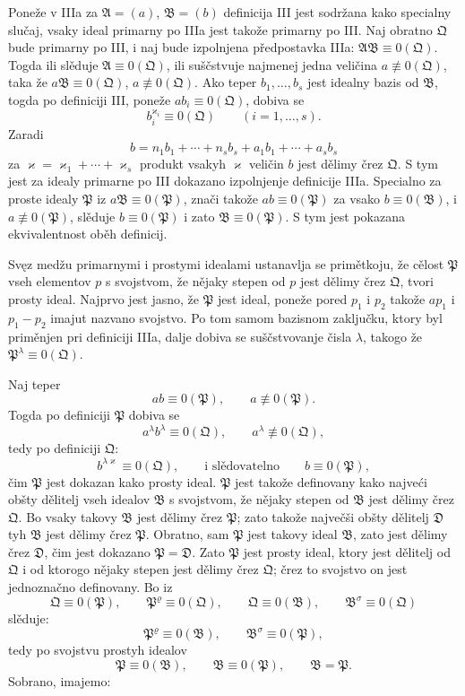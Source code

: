 \documentclass[11pt]{article}
\newcommand{\ideal}[1]{\mathfrak{#1}}
\begin{document}
Poneže v IIIa za \(\ideal A=(a)\), \(\ideal B=(b)\) definicija III jest sodržana kako specialny slučaj, vsaky ideal primarny po IIIa jest takože primarny po III. Naj obratno \(\ideal Q\) bude primarny po III, i naj bude izpolnjena předpostavka IIIa: \(\ideal A\ideal B\equiv0(\ideal Q)\). Togda ili slěduje \(\ideal A\equiv0(\ideal Q)\), ili suščstvuje najmenej jedna veličina \(a\not\equiv0(\ideal Q)\), taka že \(a\ideal B\equiv0(\ideal Q)\), \(a\not\equiv0(\ideal Q)\). Ako teper \(b_1,\ldots,b_s\) jest idealny bazis od \(\ideal B\), togda po definiciji III, poneže \(a b_i\equiv0(\ideal Q)\), dobiva se
\[
 b_i^{\varkappa_i}\equiv0(\ideal Q)\qquad (i=1,\ldots,s).
\]
Zaradi
\[
 b=n_1b_1+\cdots+n_s b_s+a_1b_1+\cdots+a_s b_s
\]
za \(\varkappa=\varkappa_1+\cdots+\varkappa_s\) produkt vsakyh \(\varkappa\) veličin \(b\) jest dělimy črez \(\ideal Q\). S tym jest za idealy primarne po III dokazano izpolnjenje definicije IIIa. Specialno za proste idealy \(\ideal P\) iz \(a\ideal B\equiv0(\ideal P)\), znači takože \(a b\equiv0(\ideal P)\) za vsako \(b\equiv0(\ideal B)\), i \(a\not\equiv0(\ideal P)\), slěduje \(b\equiv0(\ideal P)\) i zato \(\ideal B\equiv0(\ideal P)\). S tym jest pokazana ekvivalentnost oběh definicij.

Svęz medžu primarnymi i prostymi idealami ustanavlja se primětkoju, že cělost \(\ideal P\) vseh elementov \(p\) s svojstvom, že nějaky stepen od \(p\) jest dělimy črez \(\ideal Q\), tvori prosty ideal. Najprvo jest jasno, že \(\ideal P\) jest ideal, poneže pored \(p_1\) i \(p_2\) takože \(a p_1\) i \(p_1-p_2\) imajut nazvano svojstvo. Po tom samom bazisnom zaključku, ktory byl priměnjen pri definiciji IIIa, dalje dobiva se suščstvovanje čisla \(\lambda\), takogo že \(\ideal P^\lambda\equiv0(\ideal Q)\).

Naj teper
\[
 a b\equiv0(\ideal P),\qquad a\not\equiv0(\ideal P).
\]
Togda po definiciji \(\ideal P\) dobiva se
\[
 a^\lambda b^\lambda\equiv0(\ideal Q),\qquad a^\lambda\not\equiv0(\ideal Q),
\]
tedy po definiciji \(\ideal Q\):
\[
 b^{\lambda\varkappa}\equiv0(\ideal Q),\qquad\text{i slědovatelno}\qquad b\equiv0(\ideal P),
\]
čim \(\ideal P\) jest dokazan kako prosty ideal. \(\ideal P\) jest takože definovany kako najveći obšty dělitelj vseh idealov \(\ideal B\) s svojstvom, že nějaky stepen od \(\ideal B\) jest dělimy črez \(\ideal Q\). Bo vsaky takovy \(\ideal B\) jest dělimy črez \(\ideal P\); zato takože največši obšty dělitelj \(\ideal D\) tyh \(\ideal B\) jest dělimy črez \(\ideal P\). Obratno, sam \(\ideal P\) jest takovy ideal \(\ideal B\), zato jest dělimy črez \(\ideal D\), čim jest dokazano \(\ideal P=\ideal D\). Zato \(\ideal P\) jest prosty ideal, ktory jest dělitelj od \(\ideal Q\) i od ktorogo nějaky stepen jest dělimy črez \(\ideal Q\); črez to svojstvo on jest jednoznačno definovany. Bo iz
\[
 \ideal Q\equiv0(\ideal P),\qquad \ideal P^\varrho\equiv0(\ideal Q),
 \qquad
 \ideal Q\equiv0(\ideal B),\qquad \ideal B^\sigma\equiv0(\ideal Q)
\]
slěduje:
\[
 \ideal P^\varrho\equiv0(\ideal B),\qquad
 \ideal B^\sigma\equiv0(\ideal P),
\]
tedy po svojstvu prostyh idealov
\[
 \ideal P\equiv0(\ideal B),\qquad \ideal B\equiv0(\ideal P),\qquad \ideal B=\ideal P.
\]
Sobrano, imajemo:
\end{document}
